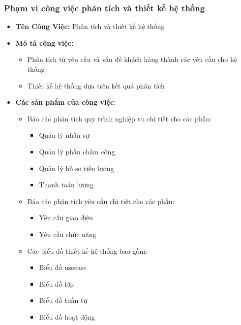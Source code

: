 \subsubsection{Phạm vi công việc phân tích và thiết kế hệ thống}
\begin{itemize}
    \item \textbf{Tên Công Việc:} Phân tích và thiết kế hệ thống
    \item \textbf{Mô tả công việc:}
          \begin{itemize}
              \item Phân tích từ yêu cầu và vấn đề khách hàng thành các yêu cầu cho hệ thống
              \item Thiết kế hệ thống dựa trên kết quả phân tích
          \end{itemize}
    \item \textbf{Các sản phẩm của công việc:}
          \begin{itemize}
              \item Báo cáo phân tích quy trình nghiệp vụ chi tiết cho các phần:
                    \begin{itemize}
                        \item Quản lý nhân sự
                        \item Quản lý phần chấm công
                        \item Quản lý hồ sơ tiền lương
                        \item Thanh toán lương
                    \end{itemize}
              \item Báo cáo phân tích yêu cầu chi tiết cho các phần:
                    \begin{itemize}
                        \item Yêu cầu giao diện
                        \item Yêu cầu chức năng
                    \end{itemize}
              \item Các biểu đồ thiết kế hệ thống bao gồm:
                    \begin{itemize}
                        \item Biểu đồ usecase
                        \item Biểu đồ lớp
                        \item Biểu đồ tuần tự
                        \item Biểu đồ hoạt động
                    \end{itemize}

\end{itemize}
\end{itemize}

